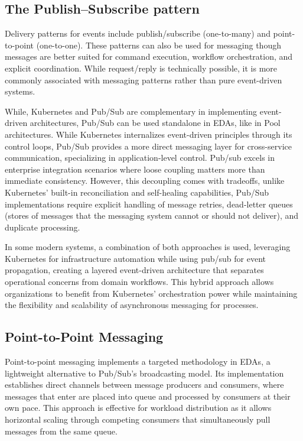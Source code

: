 \documentclass[]{final}
\begin{document}
\subsection{The Publish–Subscribe pattern}


Delivery patterns for events include publish/subscribe (one-to-many) and
point-to-point (one-to-one). These patterns can also be used for messaging
though messages are better suited for command execution, workflow
orchestration, and explicit coordination. While request/reply is technically
possible, it is more commonly associated with messaging patterns rather than
pure event-driven systems.

While, Kubernetes and Pub/Sub are complementary in implementing event-driven
architectures, Pub/Sub can be used standalone in EDAs, like in Pool
architectures. While Kubernetes internalizes event-driven principles through
its control loops, Pub/Sub provides a more direct messaging layer for
cross-service communication, specializing in application-level control.
Pub/sub excels in enterprise integration scenarios where loose coupling
matters more than immediate consistency. However, this decoupling comes
with tradeoffs, unlike Kubernetes' built-in reconciliation and self-healing
capabilities, Pub/Sub implementations require explicit handling of message
retries, dead-letter queues (stores of messages that the messaging system
cannot or should not deliver), and duplicate processing.

In some modern systems, a combination of both approaches is used, leveraging
Kubernetes for infrastructure automation while using pub/sub for event
propagation, creating a layered event-driven architecture that separates
operational concerns from domain workflows. This hybrid approach allows
organizations to benefit from Kubernetes' orchestration power while
maintaining the flexibility and scalability of asynchronous messaging for
processes.

\subsection{Point-to-Point Messaging}
Point-to-point messaging implements a targeted methodology in EDAs, a
lightweight alternative to Pub/Sub's broadcasting model. Its implementation
establishes direct channels between message producers and consumers, where
messages that enter are placed into queue and processed by consumers at
their own pace. This approach is effective for workload distribution as it
allows horizontal scaling through competing consumers that simultaneously
pull messages from the same queue.
\end{document}
